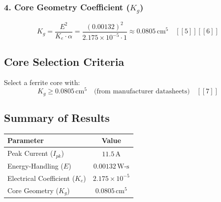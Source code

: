 \documentclass{article}
\begin{document}
	\subsubsection*{4. Core Geometry Coefficient (\(K_g\))}
	\[
	K_g = \frac{E^2}{K_e \cdot \alpha} = \frac{(0.00132)^2}{2.175 \times 10^{-5} \cdot 1} \approx \boxed{0.0805 \, \text{cm}^5} \quad [[5]][[6]]
	\]
	
	\subsection*{Core Selection Criteria}
	Select a ferrite core with:  
	\[
	K_g \geq 0.0805 \, \text{cm}^5 \quad \text{(from manufacturer datasheets)} \quad [[7]]
	\]
	
	\subsection*{Summary of Results}
	\begin{tabular}{|l|c|}
		\hline
		\textbf{Parameter} & \textbf{Value} \\
		\hline
		Peak Current (\(I_{pk}\)) & \(11.5 \, \text{A}\) \\
		Energy-Handling (\(E\)) & \(0.00132 \, \text{W-s}\) \\
		Electrical Coefficient (\(K_e\)) & \(2.175 \times 10^{-5}\) \\
		Core Geometry (\(K_g\)) & \(0.0805 \, \text{cm}^5\) \\
		\hline
	\end{tabular}
	
\end{document}
